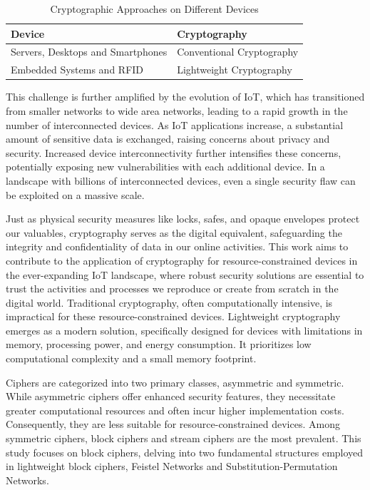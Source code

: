 \documentclass[conference]{IEEEtran}
\begin{document}
\begin{table}[ht]
    \centering
    \caption{Cryptographic Approaches on Different Devices}
    \begin{tabular}{ll}
        \toprule
        \textbf{Device} & \textbf{Cryptography} \\
        \midrule
        Servers, Desktops and Smartphones & Conventional Cryptography \\
        Embedded Systems and RFID & Lightweight Cryptography \\
        \bottomrule
    \end{tabular}
    \label{table:crypto_devices}
\end{table}

This challenge is further amplified by the evolution of IoT, which has transitioned from smaller networks to wide area networks, leading to a rapid growth in the number of interconnected devices. As IoT applications increase, a substantial amount of sensitive data is exchanged, raising concerns about privacy and security. Increased device interconnectivity further intensifies these concerns, potentially exposing new vulnerabilities with each additional device. In a landscape with billions of interconnected devices, even a single security flaw can be exploited on a massive scale.

Just as physical security measures like locks, safes, and opaque envelopes protect our valuables, cryptography serves as the digital equivalent, safeguarding the integrity and confidentiality of data in our online activities. This work aims to contribute to the application of cryptography for resource-constrained devices in the ever-expanding IoT landscape, where robust security solutions are essential to trust the activities and processes we reproduce or create from scratch in the digital world. 
Traditional cryptography, often computationally intensive, is impractical for these resource-constrained devices.  Lightweight cryptography emerges as a modern solution, specifically designed for devices with limitations in memory, processing power, and energy consumption. It prioritizes low computational complexity and a small memory footprint.

Ciphers are categorized into two primary classes, asymmetric and symmetric. While asymmetric ciphers offer enhanced security features, they necessitate greater computational resources and often incur higher implementation costs. Consequently, they are less suitable for resource-constrained devices. Among symmetric ciphers, block ciphers and stream ciphers are the most prevalent.\cite{NIST} This study focuses on block ciphers, delving into two fundamental structures employed in lightweight block ciphers, Feistel Networks and Substitution-Permutation Networks.
\end{document}
